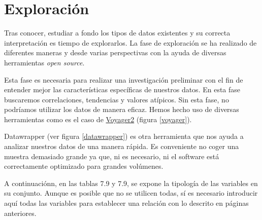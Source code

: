 \section{Exploración}
Tras conocer, estudiar a fondo los tipos de datos existentes y su correcta interpretación es tiempo de explorarlos. La fase de exploración se ha realizado de diferentes maneras y desde varias perspectivas con la ayuda de diversas herramientas \textit{open source}.

Esta fase es necesaria para realizar una investigación preliminar con el fin de entender mejor las características específicas de nuestros datos. En esta fase buscaremos correlaciones, tendencias y valores atípicos. Sin esta fase, no podríamos utilizar los datos de manera eficaz. Hemos hecho uso de diversas herramientas como es el caso de \href{http://vega.github.io/}{Voyager2} (figura \ref{voyager}).

    
Datawrapper (ver figura \ref{datawrapper}) es otra herramienta que nos ayuda a analizar nuestros datos de una manera rápida. Es conveniente no coger una muestra demasiado grande ya que, ni es necesario, ni el software está correctamente optimizado para grandes volúmenes.
    
 
A continuaciónn, en las tablas 7.9 y 7.9, se expone la tipología de las variables en su conjunto. Aunque es posible que no se utilicen todas, sí es necesario introducir aquí todas las variables para establecer una relación con lo descrito en páginas anteriores.

